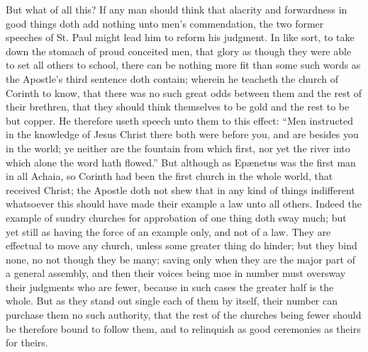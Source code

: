 But what of all this? If any man should think that alacrity  and forwardness in good things doth add nothing unto men’s commendation, the two former speeches of St. Paul might lead him to reform his judgment. In like sort, to take down the stomach of proud conceited men, that glory as though they were able to set all others to school, there can be nothing more fit than some such words as the Apostle’s third sentence doth contain; wherein he teacheth the church of Corinth to know, that there was no such great odds between them and the rest of their brethren, that they should think themselves to be gold and the rest to be but copper. He therefore useth speech unto them to this effect: “Men instructed in the knowledge of Jesus Christ there both were before you, and are besides you in the world; ye neither are the fountain from which first, nor yet the river into which alone the word hath flowed.” But although as Epænetus was the first man in all Achaia, so Corinth had been the first church in the whole world, that received Christ; the Apostle doth not shew that in any kind of things indifferent whatsoever this should have made their example a law unto all others. Indeed the example of sundry churches for approbation of one thing doth sway much; but yet still as having the force of an example only, and not of a law. They are effectual to move any church, unless some greater thing do hinder; but they bind none, no not though they be many; saving only when they are the major part of a general assembly, and then their voices being moe in number must oversway their judgments who are fewer, because in such cases the greater half is the whole. But as they stand out single each of them by itself, their number can purchase them no such authority, that the rest of the churches being fewer should be therefore bound to follow them, and to relinquish as good ceremonies as theirs for theirs.

